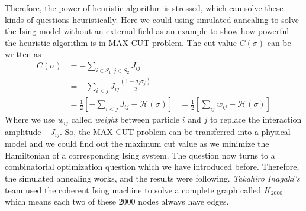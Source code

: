 \documentclass{turabian-researchpaper}
\begin{document}
        Therefore, the power of heuristic algorithm is stressed, which can solve these kinds of questions heuristically. Here we could using simulated annealing to solve the Ising model without an external field as an example to show how powerful the heuristic algorithm is in MAX-CUT problem. The cut value $C(\sigma)$ can be written as
            \begin{equation}
                \begin{aligned}
                    C(\sigma) &= -\sum_{i\in S_1, j\in S_2} J_{ij}\\
                    &= -\sum_{i<j} J_{ij}\frac{(1-\sigma_i\sigma_j)}{2}\\
                    &= \frac{1}{2}[-\sum_{i<j} J_{ij} - \mathcal{H} (\sigma)]
                    &= \frac{1}{2}[\sum_{ij}w_{ij}-\mathcal{H} (\sigma)]
                \end{aligned}
            \end{equation}
        Where we use $w_{ij}$ called \textit{weight} between particle $i$ and $j$ to replace the interaction amplitude $-J_{ij}$. So, the MAX-CUT problem can be transferred into a physical model and we could find out the maximum cut value as we minimize the Hamiltonian of a corresponding Ising system. The question now turns to a combinatorial optimization question which we have introduced before. Therefore, the simulated annealing works, and the results were following. \textit{Takahiro Inagaki's} team used the coherent Ising machine to solve a complete graph called $K_{2000}$ which means each two of these 2000 nodes always have edges. 
\end{document}
